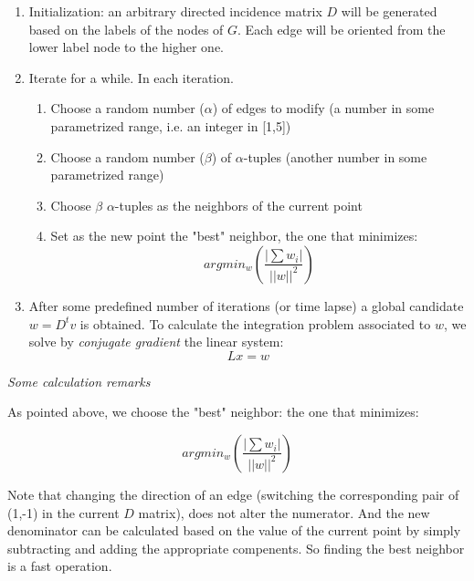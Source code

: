 \documentclass[a4paper,11pt]{article}
\begin{document}
\begin{enumerate}
	\item Initialization: an arbitrary directed incidence matrix $D$ 
	will be generated based on the labels of the nodes of $G$. Each edge 
	will be oriented from the lower label node to the higher one. 
	\item Iterate for a while. In each iteration.
	\begin{enumerate}
		\item Choose a random number ($\alpha$) of edges to modify (a 
		number in some parametrized range, i.e. an integer in [1,5])
		\item Choose a random number ($\beta$) of $\alpha$-tuples 
		(another number in some parametrized range)
		\item Choose $\beta$ $\alpha$-tuples as the neighbors of the
		current point
		\item Set as the new point the "best" neighbor, the one that 
		minimizes:
		$$argmin_w(\frac{|\sum w_i|}{||w||^2})$$
 	\end{enumerate}
	\item After some predefined number of iterations (or time lapse) a  
	global candidate $w = D^t v$ is obtained. To calculate the 
	integration problem associated to $w$, we solve by 
	\textit{conjugate gradient} the linear system:
	$$L x = w$$
\end{enumerate}

\bigskip

\emph{Some calculation remarks}

\bigskip

As pointed above, we choose the "best" neighbor: the one that minimizes:

$$argmin_w(\frac{|\sum w_i|}{||w||^2})$$

Note that changing the direction of an edge (switching the corresponding 
pair of (1,-1) in the current $D$ matrix), does not alter the 
numerator. And the new denominator can be calculated based on the value 
of the current point by simply subtracting and adding the appropriate 
compenents. So finding the best neighbor is a fast operation.
\end{document}
